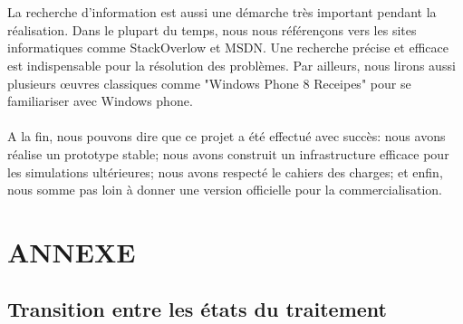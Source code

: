 \documentclass{article}
\begin{document}
\\\\
La recherche d'information est aussi une démarche très important pendant la réalisation. Dans le plupart du temps, nous nous référençons vers les sites informatiques comme StackOverlow et MSDN. Une recherche précise et efficace est indispensable pour la résolution des problèmes.  Par ailleurs, nous lirons aussi plusieurs œuvres classiques comme "Windows Phone 8 Receipes" pour se familiariser avec Windows phone. 
\\\\
A la fin, nous pouvons dire que ce projet a été effectué avec succès: nous avons réalise un prototype stable; nous avons construit un infrastructure efficace pour les simulations ultérieures; nous avons respecté le cahiers des charges; et enfin, nous somme pas loin à donner une version officielle pour la commercialisation.

\newpage
\section{\LARGE ANNEXE }

\vspace{0.2 cm}
\subsection{\Large Transition entre les états du traitement}
\end{document}
